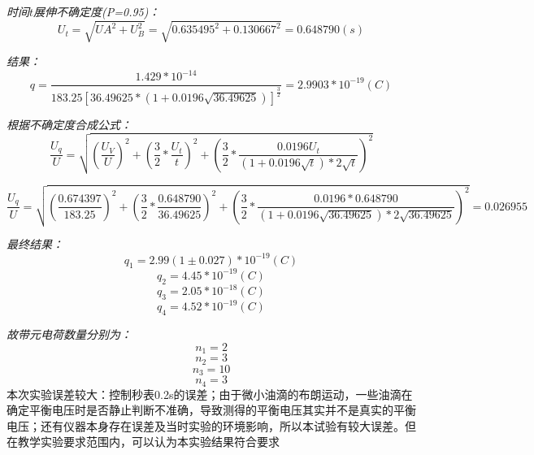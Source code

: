 \documentclass[UTF8]{ctexart}
\begin{document}
        \emph{时间$t$展伸不确定度(P=0.95)：}
        \begin{equation*}
           U_{t}=\sqrt{UA^2+U_B^2}= \sqrt{0.635495^2+0.130667^2}=0.648790(s)
        \end{equation*}

        \emph{结果：}
        \begin{equation*}
            q=\frac{1.429*10^{-14}}{183.25[36.49625*(1+0.0196\sqrt{36.49625})]^{\frac{3}{2}}} =2.9903*10^{-19}(C)
        \end{equation*}

        \emph{根据不确定度合成公式：}
        \begin{equation}
            \frac{U_q}{U}=\sqrt{(\frac{U_V}{U})^2+(\frac32 *\frac{U_t}{t})^2+(\frac32 * \frac{0.0196U_t}{(1+0.0196\sqrt{t})*2\sqrt{t}})^2}
        \end{equation}

        \begin{equation*}
            \frac{U_q}{U}=\sqrt{(\frac{0.674397}{183.25})^2+(\frac32 *\frac{0.648790}{36.49625})^2+(\frac32 * \frac{0.0196*0.648790}{(1+0.0196\sqrt{36.49625})*2\sqrt{36.49625}})^2}=0.026955
        \end{equation*} 

        \emph{最终结果：}
        \begin{equation*}
            q_1=2.99(1±0.027)*10^{-19}(C)
        \end{equation*} 
        \begin{equation*}
            q_2=4.45*10^{-19}(C)
        \end{equation*}
        \begin{equation*}
            q_3=2.05*10^{-18}(C)
        \end{equation*}
        \begin{equation*}
            q_4=4.52*10^{-19}(C)
        \end{equation*}

        \emph{故带元电荷数量分别为：}
        \begin{equation*}
            n_1=2
        \end{equation*}
        \begin{equation*}
            n_2=3
        \end{equation*}
        \begin{equation*}
            n_3=10
        \end{equation*}
        \begin{equation*}
            n_4=3
        \end{equation*}
        本次实验误差较大：控制秒表0.2s的误差；由于微小油滴的布朗运动，一些油滴在确定平衡电压时是否静止判断不准确，导致测得的平衡电压其实并不是真实的平衡电压；还有仪器本身存在误差及当时实验的环境影响，所以本试验有较大误差。但在教学实验要求范围内，可以认为本实验结果符合要求
\end{document}
